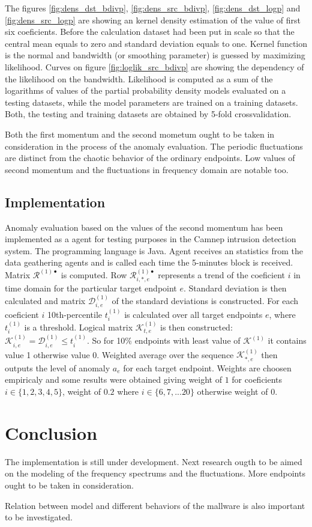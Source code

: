 The figures \ref{fig:dens_dst_bdivp}, \ref{fig:dens_src_bdivp},
\ref{fig:dens_dst_logp} and \ref{fig:dens_src_logp} are showing
an kernel density estimation of the value of first six coeficients.
Before the calculation dataset had been put in scale so that the
central mean equals to zero and standard deviation equals to one.
Kernel function is the normal and bandwidth (or smoothing parameter)
is guessed by maximizing likelihood. 
Curves on figure \ref{fig:loglik_src_bdivp} are showing
the dependency of the likelihood on the bandwidth. 
Likelihood is computed as a sum of the logarithms of values of the
partial probability density models evaluated on a testing datasets,
while the model parameters are trained on a training datasets. 
Both, the testing and training datasets are obtained by 5-fold
crossvalidation.

Both the first momentum and the second mometum ought to be taken in
consideration in the process of the anomaly evaluation.
The periodic fluctuations are distinct from the
chaotic behavior of the ordinary endpoints. Low values of second
momentum and the fluctuations in frequency domain are notable too.

\subsection{Implementation}
Anomaly evaluation based on the values of the second momentum has
been implemented as a agent for testing purposes in the Camnep
intrusion detection system. The programming language is Java.
Agent receives an statistics from the data geathering agents and
is called each time the 5-minutes block is received. Matrix
$\mathcal{R}^{(1)\bullet}$ is computed. Row
$\mathcal{R}^{(1)\bullet}_{i,*,e}$ represents a trend of the
coeficient $i$ in time domain for the particular target endpoint $e$.
Standard deviation is then calculated and matrix 
$\mathcal{D}^{(1)}_{i,e}$ of the standard deviations is constructed.
For each coeficient $i$ 10th-percentile $t^{(1)}_i$ is calculated
over all target endpoints $e$, where $t^{(1)}_i$ is a threshold.
Logical matrix $\mathcal{K}^{(1)}_{t,e}$ is then constructed:
$\mathcal{K}^{(1)}_{i,e} = \mathcal{D}^{(1)}_{i,e} \le t^{(1)}_i $.
So for 10\% endpoints with least value of $\mathcal{K}^{(1)}$
it contains value 1 otherwise value 0. Weighted average over the
sequence $\mathcal{K}^{(1)}_{*,e}$ then outputs the level of anomaly
$a_e$ for each target endpoint. 
Weights are choosen empiricaly and some results were obtained giving
weight of $1$ for coeficients $i \in \{1,2,3,4,5\}$, weight of $0.2$
where $i\in \{6,7,... 20\}$ otherwise weight of $0$.

\section{Conclusion}
The implementation is still under development. Next research ougth to be aimed on the modeling of the
frequency spectrums and the fluctuations. More endpoints ought to be taken in consideration. 

Relation between model and different behaviors of the mallware is also important to be investigated.